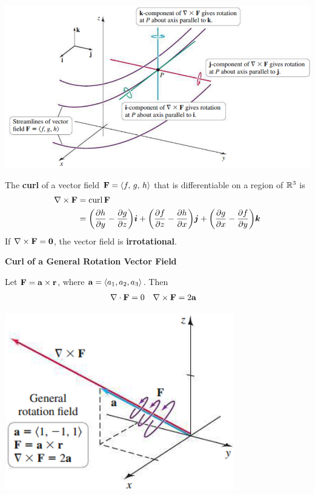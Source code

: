 \documentclass[mathNotesPreamble]{subfiles}
\begin{document}
  \begin{flushright}
    \includegraphics[width=0.8\linewidth]{images/briggs_17_05/fig17_40}
  \end{flushright}

  \begin{defn*}
    The \textbf{curl} of a vector field $\mathbf F={\left\langle f,\,g,\,h \right\rangle}$ that is differentiable on a region of $\mathbb{R}^3$ is
    \begin{align*}
      \nabla\times\mathbf F&=\operatorname{curl} \mathbf F\\
        &={\left(\frac{\partial h}{\partial y}-\frac{\partial g}{\partial z}\right)}{\bm{i}}+{\left(\frac{\partial f}{\partial z}-\frac{\partial h}{\partial x}\right)}{\bm{j}}+{\left(\frac{\partial g}{\partial x}-\frac{\partial f}{\partial y}\right)}{\bm{k}}
    \end{align*}
    If $\nabla\times\mathbf F=\mathbf{0}$, the vector field is \textbf{irrotational}.
  \end{defn*}
  \pagebreak

  \noindent
  \textbf{Curl of a General Rotation Vector Field}

  Let $\mathbf F={\mathbf{a}}\times{\mathbf{r}}$, where ${\mathbf{a}}={\left\langle a_1, a_2, a_3 \right\rangle}$. Then
  \begin{align*}
    \nabla\cdot\mathbf F&=0&
    \nabla\times\mathbf F&=2{\mathbf{a}}
  \end{align*}

  \begin{center}
    \includegraphics[width=0.5\linewidth]{images/briggs_17_05/fig17_41}
  \end{center}
\end{document}
